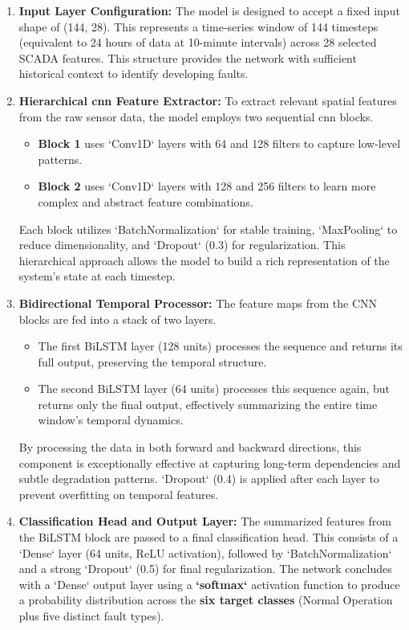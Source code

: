 \documentclass[12pt]{article}
\begin{document}
\begin{enumerate} 
    \item \textbf{Input Layer Configuration:} The model is designed to accept a fixed input shape of (144, 28). This represents a time-series window of 144 timesteps (equivalent to 24 hours of data at 10-minute intervals) across 28 selected SCADA features. This structure provides the network with sufficient historical context to identify developing faults.
    \item \textbf{Hierarchical cnn Feature Extractor:} To extract relevant spatial features from the raw sensor data, the model employs two sequential cnn blocks.
    \begin{itemize}
        \item \textbf{Block 1} uses `Conv1D` layers with 64 and 128 filters to capture low-level patterns.
        \item \textbf{Block 2} uses `Conv1D` layers with 128 and 256 filters to learn more complex and abstract feature combinations.
    \end{itemize}
    Each block utilizes `BatchNormalization` for stable training, `MaxPooling` to reduce dimensionality, and `Dropout` (0.3) for regularization. This hierarchical approach allows the model to build a rich representation of the system's state at each timestep.
    
    \item \textbf{Bidirectional Temporal Processor:} The feature maps from the CNN blocks are fed into a stack of two layers.
    \begin{itemize}
        \item The first BiLSTM layer (128 units) processes the sequence and returns its full output, preserving the temporal structure.
        \item The second BiLSTM layer (64 units) processes this sequence again, but returns only the final output, effectively summarizing the entire time window's temporal dynamics.
    \end{itemize}
    By processing the data in both forward and backward directions, this component is exceptionally effective at capturing long-term dependencies and subtle degradation patterns. `Dropout` (0.4) is applied after each layer to prevent overfitting on temporal features.
    
    \item \textbf{Classification Head and Output Layer:} The summarized features from the BiLSTM block are passed to a final classification head. This consists of a `Dense` layer (64 units, ReLU activation), followed by `BatchNormalization` and a strong `Dropout` (0.5) for final regularization. The network concludes with a `Dense` output layer using a \textbf{`softmax`} activation function to produce a probability distribution across the \textbf{six target classes} (Normal Operation plus five distinct fault types). 
\end{enumerate}
\end{document}
